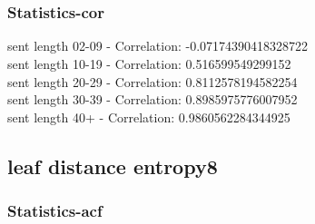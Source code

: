 \documentclass{article}%
\begin{document}
\begin{figure}[ht]%
\centering%
\setlength{\abovecaptionskip}{-35pt}%
%
%
\\%
%
%
\\%
%
\end{figure}

%
\newpage%
\subsubsection{Statistics{-}cor}%
\label{ssubsec:Statistics{-}cor}%
\noindent%
sent length 02-09 - Correlation: -0.07174390418328722\\%
sent length 10-19 - Correlation: 0.516599549299152\\%
sent length 20-29 - Correlation: 0.8112578194582254\\%
sent length 30-39 - Correlation: 0.8985975776007952\\%
sent length 40+ - Correlation: 0.9860562284344925\\

%
\newpage

%
\subsection{leaf distance entropy8}%
\label{subsec:leafdistanceentropy8}%
\subsubsection{Statistics{-}acf}%
\label{ssubsec:Statistics{-}acf}%
\end{document}
